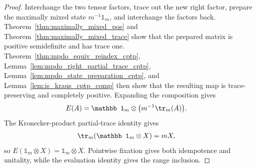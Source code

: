 \begin{proof}\leanok
    Interchange the two tensor factors, trace out the new right factor,
    prepare the maximally mixed state $m^{-1}\mathbb1_m$, and interchange
    the factors back. Theorem~\ref{thm:maximally_mixed_pos} and
    Theorem~\ref{thm:maximally_mixed_trace} show that the prepared matrix is
    positive semidefinite and has trace one. Theorem~\ref{thm:mpdo_equiv_reindex_cptp},
    Lemma~\ref{lem:mpdo_right_partial_trace_cptp},
    Lemma~\ref{lem:mpdo_state_preparation_cptp}, and
    Lemma~\ref{lem:is_kraus_cptp_comp} then show that the resulting map is
    trace-preserving and completely positive. Expanding the composition gives
    \begin{align}
        E(A)&=\mathbb1_m\otimes\bigl(m^{-1}\tr_{m}(A)\bigr).
        \notag
    \end{align}
    The Kronecker-product partial-trace identity gives
    \begin{align}
        \tr_{m}(\mathbb1_m\otimes X)&=mX,
        \notag
    \end{align}
    so $E(\mathbb1_m\otimes X)=\mathbb1_m\otimes X$. Pointwise fixation
    gives both idempotence and unitality, while the evaluation identity gives
    the range inclusion.
\end{proof}

